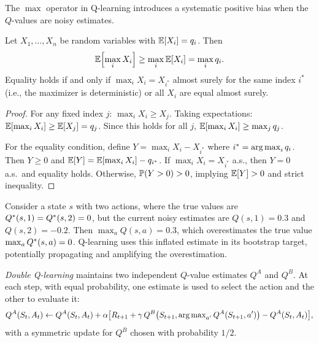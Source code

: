 \documentclass[11pt,a4paper]{article}
\begin{document}
The $\max$ operator in Q-learning introduces a systematic positive
bias when the $Q$-values are noisy estimates.

\begin{proposition}
\label{prop:max_bias}
Let $X_1, \ldots, X_n$ be random variables with
$\mathbb{E}[X_i] = q_i$. Then
\begin{equation}
  \mathbb{E}\!\left[\max_{i} X_i\right] \geq \max_{i} \mathbb{E}[X_i]
  = \max_i q_i.
  \label{eq:max_bias}
\end{equation}
Equality holds if and only if $\max_i X_i = X_{i^*}$ almost surely
for the same index $i^*$ (i.e., the maximizer is deterministic) or
all $X_i$ are equal almost surely.
\end{proposition}

\begin{proof}
For any fixed index $j$: $\max_i X_i \geq X_j$. Taking
expectations: $\mathbb{E}[\max_i X_i] \geq \mathbb{E}[X_j] = q_j$. Since this
holds for all $j$, $\mathbb{E}[\max_i X_i] \geq \max_j q_j$.

For the equality condition, define $Y = \max_i X_i - X_{i^*}$ where
$i^* = \operatorname{arg\,max}_i q_i$. Then $Y \geq 0$ and
$\mathbb{E}[Y] = \mathbb{E}[\max_i X_i] - q_{i^*}$. If $\max_i X_i = X_{i^*}$
a.s., then $Y = 0$ a.s.\ and equality holds. Otherwise,
$\mathbb{P}(Y > 0) > 0$, implying $\mathbb{E}[Y] > 0$ and strict inequality.
\end{proof}

\begin{example}
\label{ex:max_bias}
Consider a state $s$ with two actions, where the true values are
$Q^*(s,1) = Q^*(s,2) = 0$, but the current noisy estimates
are $Q(s,1) = 0.3$ and $Q(s,2) = -0.2$. Then
$\max_a Q(s,a) = 0.3$, which overestimates the true value
$\max_a Q^*(s,a) = 0$. Q-learning uses this inflated estimate
in its bootstrap target, potentially propagating and amplifying the
overestimation.
\end{example}

\begin{definition}
\label{def:double_q}
\emph{Double Q-learning} maintains two independent $Q$-value
estimates $Q^A$ and $Q^B$. At each step, with equal probability,
one estimate is used to select the action and the other to evaluate
it:
\begin{equation}
  Q^A(S_t, A_t) \leftarrow Q^A(S_t, A_t)
  + \alpha\bigl[R_{t+1} + \gamma\, Q^B\bigl(S_{t+1},
    \operatorname{arg\,max}_{a'} Q^A(S_{t+1}, a')\bigr) - Q^A(S_t, A_t)\bigr],
  \label{eq:double_q}
\end{equation}
with a symmetric update for $Q^B$ chosen with probability $1/2$.
\end{definition}
\end{document}
